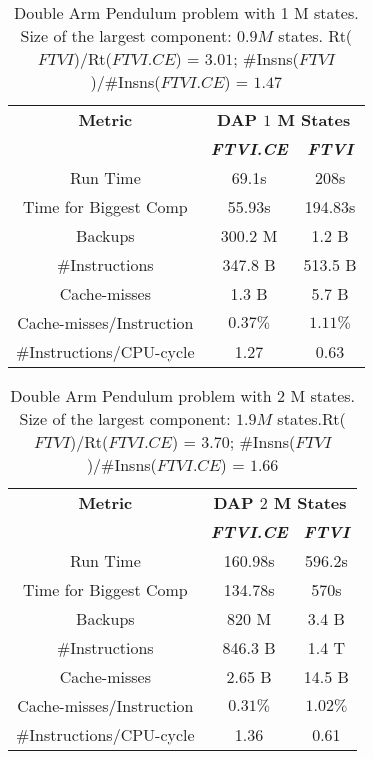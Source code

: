 \documentclass[conference]{IEEEtran}
\begin{document}
\begin{table}[h!]
\caption{Double Arm Pendulum problem with 1 M states. Size of the largest component: $0.9 M$ states. Rt($FTVI$)/Rt($FTVI.CE$) = $3.01$; \#Insns($FTVI$)/\#Insns($FTVI.CE$) = $1.47$}
\begin{center}
\begin{tabular}{|c|c|c|}
\hline
\textbf{Metric}&\multicolumn{2}{|c|}{\textbf{DAP $1$ M States}} \\
\cline{2-3} 
\textbf{} & \textbf{\textit{FTVI.CE}} & \textbf{\textit{FTVI}} \\
\hline
Run Time & 69.1s & 208s \\
\hline
Time for Biggest Comp & 55.93s & 194.83s \\
\hline
Backups & 300.2 M & 1.2 B \\
\hline
\#Instructions & 347.8 B & 513.5 B \\
\hline
Cache-misses & 1.3 B & 5.7 B \\
\hline 
Cache-misses/Instruction & $0.37\%$ & $1.11\%$ \\
\hline
\#Instructions/CPU-cycle & 1.27 & 0.63 \\
\hline%
\end{tabular}
\label{tab4}
\end{center}
\end{table}

\begin{table}[h!]
\caption{Double Arm Pendulum problem with 2 M states. Size of the largest component: $1.9 M$ states.Rt($FTVI$)/Rt($FTVI.CE$) = $3.70$; \#Insns($FTVI$)/\#Insns($FTVI.CE$) = $1.66$}
\begin{center}
\begin{tabular}{|c|c|c|}
\hline
\textbf{Metric}&\multicolumn{2}{|c|}{\textbf{DAP $2$ M States}} \\
\cline{2-3}
\textbf{} & \textbf{\textit{FTVI.CE}} & \textbf{\textit{FTVI}} \\
\hline
Run Time & 160.98s & 596.2s \\
\hline
Time for Biggest Comp & 134.78s & 570s \\
\hline
Backups & 820 M & 3.4 B \\
\hline
\#Instructions & 846.3 B & 1.4 T \\
\hline
Cache-misses & 2.65 B & 14.5 B \\
\hline 
Cache-misses/Instruction & $0.31\%$ & $1.02\%$ \\
\hline
\#Instructions/CPU-cycle & 1.36 & 0.61 \\
\hline%
\end{tabular}
\label{tab5}
\end{center}
\end{table}
\end{document}
